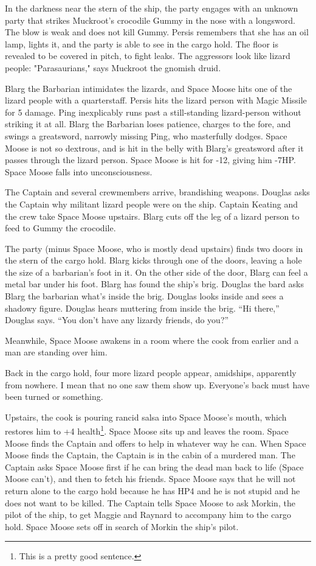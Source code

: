 \documentclass{article}
\begin{document}
In the darkness near the stern of the ship, the party engages with an unknown party that strikes Muckroot's crocodile Gummy in the nose with a longsword. The blow is weak and does not kill Gummy. Persis remembers that she has an oil lamp, lights it, and the party is able to see in the cargo hold. The floor is revealed to be covered in pitch, to fight leaks. The aggressors look like lizard people: "Parasaurians," says Muckroot the gnomish druid.

Blarg the Barbarian intimidates the lizards, and Space Moose hits one of the lizard people with a quarterstaff. Persis hits the lizard person with Magic Missile for 5 damage. Ping inexplicably runs past a still-standing lizard-person without striking it at all. Blarg the Barbarian loses patience, charges to the fore, and swings a greatsword, narrowly missing Ping, who masterfully dodges. Space Moose is not so dextrous, and is hit in the belly with Blarg's greatsword after it passes through the lizard person. Space Moose is hit for -12, giving him -7HP. Space Moose falls into unconsciousness. 

The Captain and several crewmembers arrive, brandishing weapons. Douglas asks the Captain why militant lizard people were on the ship. Captain Keating and the crew take Space Moose upstairs. Blarg cuts off the leg of a lizard person to feed to Gummy the crocodile.

The party (minus Space Moose, who is mostly dead upstairs) finds two doors in the stern of the cargo hold. Blarg kicks through one of the doors, leaving a hole the size of a barbarian's foot in it.
On the other side of the door, Blarg can feel a metal bar under his foot. Blarg has found the ship's brig. Douglas the bard asks Blarg the barbarian what's inside the brig. Douglas looks inside and sees a shadowy figure. Douglas hears muttering from inside the brig. ``Hi there,'' Douglas says. ``You don't have any lizardy friends, do you?''

Meanwhile, Space Moose awakens in a room where the cook from earlier and a man are standing over him.

Back in the cargo hold, four more lizard people appear, amidships, apparently from nowhere. I mean that no one saw them show up. Everyone's back must have been turned or something.

Upstairs, the cook is pouring rancid salsa into Space Moose's mouth, which restores him to +4 health\footnote{This is a pretty good sentence.}. Space Moose sits up and leaves the room. Space Moose finds the Captain and offers to help in whatever way he can. When Space Moose finds the Captain, the Captain is in the cabin of a murdered man. The Captain asks Space Moose first if he can bring the dead man back to life (Space Moose can't), and then to fetch his friends. Space Moose says that he will not return alone to the cargo hold because he has HP4 and he is not stupid and he does not want to be killed. The Captain tells Space Moose to ask Morkin, the pilot of the ship, to get Maggie and Raynard to accompany him to the cargo hold. Space Moose sets off in search of Morkin the ship's pilot.
\end{document}
